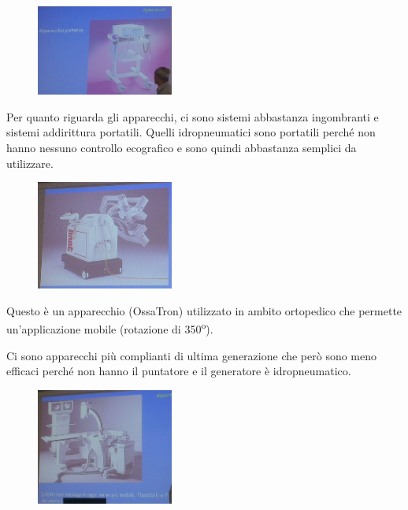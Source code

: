 \begin{figure}[!ht]
\centering
\includegraphics[width=0.4\textwidth]{025/image8.jpeg}
\end{figure}

Per
quanto riguarda gli apparecchi, ci sono sistemi abbastanza ingombranti e
sistemi addirittura portatili. Quelli idropneumatici sono portatili
perché non hanno nessuno controllo ecografico e sono quindi abbastanza
semplici da utilizzare.

\begin{figure}[!ht]
\centering
\includegraphics[width=0.4\textwidth]{025/image9.jpeg}
\end{figure}

Questo è un apparecchio (OssaTron) utilizzato in ambito ortopedico che
permette un'applicazione mobile (rotazione di 350\textsuperscript{o}).

Ci sono apparecchi più complianti di ultima generazione che però sono
meno efficaci perché non hanno il puntatore e il generatore è
idropneumatico.

\begin{figure}[!ht]
\centering
\includegraphics[width=0.4\textwidth]{025/image10.jpeg}
\end{figure}

